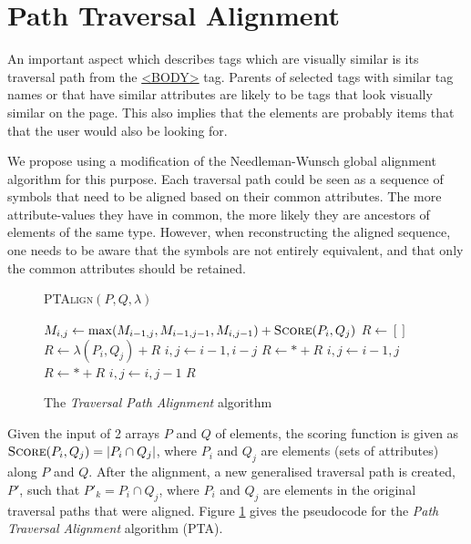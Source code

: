 \section{Path Traversal Alignment}
An important aspect which describes tags which are visually similar is its traversal path from the \url{<BODY>} tag. Parents of selected tags with similar tag names or that have similar attributes are likely to be tags that look visually similar on the page. This also implies that the elements are probably items that that the user would also be looking for.

We propose using a modification of the Needleman-Wunsch global alignment algorithm for this purpose. Each traversal path could be seen as a sequence of symbols that need to be aligned based on their common attributes. The more attribute-values they have in common, the more likely they are ancestors of elements of the same type. However, when reconstructing the aligned sequence, one needs to be aware that the symbols are not entirely equivalent, and that only the common attributes should be retained. 

\begin{figure}[htbp]
\singlespacing
	\begin{algorithm}[H]
	\caption{\textsc{PTAlign}$(P,Q,\lambda)$}
	\begin{algorithmic}[1]
				\STATE $M_{i,j} \leftarrow \max(M_{i-1,j},M_{i-1,j-1},M_{i,j-1}) + \textsc{Score}(P_i,Q_j)$
			\ENDFOR	
		\ENDFOR
		\STATE $R \leftarrow []$
				\STATE $R \leftarrow \lambda(P_i,Q_j) + R$
				\STATE $i,j \leftarrow i-1,i-j$
				\STATE $R \leftarrow * + R$
				\STATE $i,j \leftarrow i-1,j$
				\STATE $R \leftarrow * + R$
				\STATE $i,j \leftarrow i,j-1$
	    	\ENDIF	
		\ENDWHILE
		\RETURN $R$
	\end{algorithmic}
	\end{algorithm}
\caption{The \textit{Traversal Path Alignment} algorithm}
\label{fig:lcas}
\end{figure}



Given the input of 2 arrays $P$ and $Q$ of elements, the scoring function is given as $\textsc{Score}(P_i,Q_j) = |P_i \cap Q_j|$, where $P_i$ and $Q_j$ are elements (sets of attributes) along $P$ and $Q$. After the alignment, a new generalised traversal path is created, $P'$, such that $P'_k = P_i \cap Q_j$, where $P_i$ and $Q_j$ are elements in the original traversal paths that were aligned. Figure \ref{fig:lcas} gives the pseudocode for the \textit{Path Traversal Alignment} algorithm (PTA).


